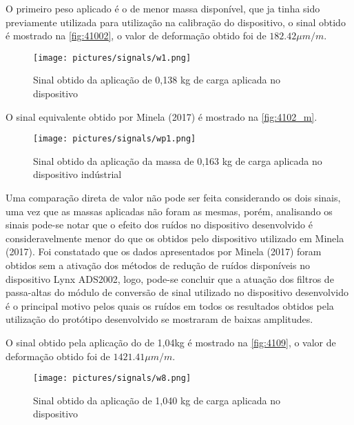 O primeiro peso aplicado é o de menor massa disponível, que ja tinha sido previamente utilizada para utilização na calibração do dispositivo,
o sinal obtido é mostrado na \autoref{fig:41002}, o valor de deformação obtido foi de $ 182.42 {\mu}m/m $.

\begin{figure}[H]
	\caption{\label{fig:41002} Sinal obtido da aplicação de 0,138 kg de carga aplicada no dispositivo}
	\begin{center}
		\texttt{[image: pictures/signals/w1.png]}
	\end{center}
\end{figure}

O sinal equivalente obtido por Minela (2017) é mostrado na \autoref{fig:4102_m}.

\begin{figure}[H]
	\caption{\label{fig:4102_m} Sinal obtido da aplicação da massa de 0,163 kg de carga aplicada no dispositivo indústrial}
	\begin{center}
		\texttt{[image: pictures/signals/wp1.png]}
	\end{center}
\end{figure}

Uma comparação direta de valor não pode ser feita considerando os dois sinais, uma vez que as massas aplicadas não foram as mesmas, porém, analisando os sinais
pode-se notar que o efeito dos ruídos no dispositivo desenvolvido é consideravelmente menor do que os obtidos pelo dispositivo utilizado em Minela (2017).
Foi constatado que os dados apresentados por Minela (2017) foram obtidos sem a ativação dos métodos de redução de ruídos disponíveis no dispositivo Lynx ADS2002,
logo, pode-se concluir que a atuação dos filtros de passa-altas do módulo de conversão de sinal utilizado no dispositivo desenvolvido é o principal motivo pelos quais
os ruídos em todos os resultados obtidos pela utilização do protótipo desenvolvido se mostraram de baixas amplitudes.

O sinal obtido pela aplicação do de 1,04kg é mostrado na \autoref{fig:4109}, o valor de deformação obtido foi de $ 1421.41 {\mu}m/m $.

\begin{figure}[H]
	\caption{\label{fig:4109} Sinal obtido da aplicação de 1,040 kg de carga aplicada no dispositivo}
	\begin{center}
		\texttt{[image: pictures/signals/w8.png]}
	\end{center}
\end{figure}

